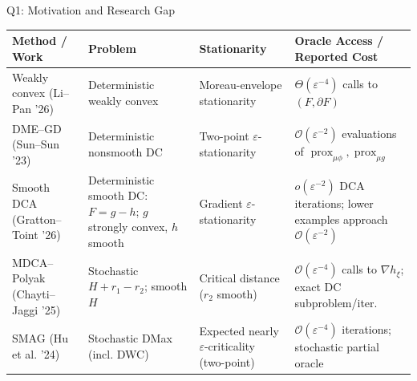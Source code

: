 \documentclass[10pt]{beamer}
\begin{document}


    
\begin{frame}{Q1: Motivation and Research Gap}
\scriptsize
\centering
\setlength{\tabcolsep}{3pt}
\renewcommand{\arraystretch}{1.10}

\begin{tabular}{
    >{\raggedright\arraybackslash}p{}
    >{\raggedright\arraybackslash}p{}
    >{\raggedright\arraybackslash}p{}
    >{\raggedright\arraybackslash}p{}}
\toprule
\textbf{Method / Work}
& \textbf{Problem}
& \textbf{Stationarity}
& \textbf{Oracle Access / Reported Cost} \\
\midrule
Weakly convex\newline
(Li--Pan '26)
& Deterministic weakly convex
& Moreau-envelope stationarity
& $\Theta(\varepsilon^{-4})$ calls to
  $(F,\partial F)$ \\

DME--GD\newline
(Sun--Sun '23)
& Deterministic nonsmooth DC
& Two-point $\varepsilon$-stationarity
& $\mathcal O(\varepsilon^{-2})$ evaluations of
  $\operatorname{prox}_{\mu\phi},\operatorname{prox}_{\mu g}$ \\

Smooth DCA\newline
(Gratton--Toint '26)
& Deterministic smooth DC:
  $F=g-h$; $g$ strongly convex, $h$ smooth
& Gradient $\varepsilon$-stationarity
& $o(\varepsilon^{-2})$ DCA iterations;
  lower examples approach $\mathcal O(\varepsilon^{-2})$ \\

MDCA--Polyak\newline
(Chayti--Jaggi '25)
& Stochastic $H+r_1-r_2$; smooth $H$
& Critical distance ($r_2$ smooth)
& $\mathcal O(\varepsilon^{-4})$ calls to $\nabla h_\xi$;
  exact DC subproblem/iter. \\

SMAG\newline
(Hu et al. '24)
& Stochastic DMax (incl. DWC)
& Expected nearly $\varepsilon$-criticality (two-point)
& $\mathcal O(\varepsilon^{-4})$ iterations;
  stochastic partial oracle \\


\end{tabular}
\end{frame}
\end{document}
